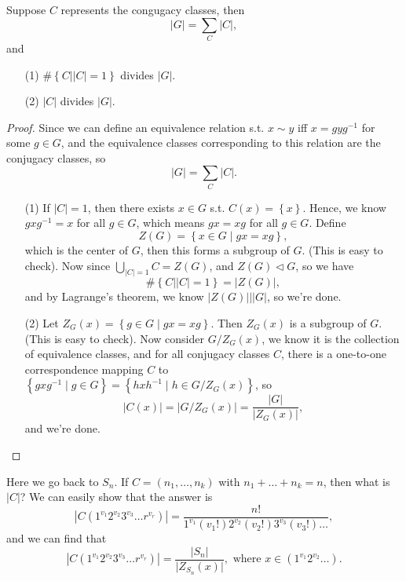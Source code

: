 \begin{theorem}
    Suppose \(C\) represents the congugacy classes, then 
    \[
        \vert G \vert = \sum_{C} \vert C \vert,   
    \] and 
    \begin{itemize}
        \item [(1)] \(\# \left\{ C \mid \vert C \vert = 1  \right\} \) divides \(\vert G \vert \). 
        \item [(2)] \(\vert C \vert \) divides \(\vert G \vert \).    
    \end{itemize}
\end{theorem}
\begin{proof}
    Since we can define an equivalence relation s.t. \(x \sim y\) iff \(x = g y g^{-1}\) for some \(g \in G\), and the equivalence classes corresponding to this relation are the conjugacy classes, so 
    \[
        \left\vert G \right\vert = \sum_{C} \vert C \vert.   
    \] 
    \begin{itemize}
        \item [(1)] If \(\vert C \vert = 1\), then there exists \(x \in G\) s.t. \(C(x) = \left\{ x \right\} \). Hence, we know \(g x g^{-1} = x\) for all \(g \in G\), which means \(gx = xg\) for all \(g \in G\). Define 
        \[
            Z(G) = \left\{ x \in G \mid gx = xg \right\}, 
        \] which is the center of \(G\), then this forms a subgroup of \(G\). (This is easy to check). Now since \(\bigcup_{\vert C \vert = 1 } C = Z(G) \), and \(Z(G) \triangleleft G \), so we have
        \[
            \# \left\{ C \mid \vert C \vert = 1  \right\} = \vert Z(G) \vert,  
        \] and by Lagrange's theorem, we know \(\vert Z(G) \vert \mid \vert G \vert  \), so we're done. 
        \item [(2)] Let \(Z_G(x) = \left\{ g \in G \mid gx = xg \right\} \). Then \(Z_G(x) \) is a subgroup of \(G\). (This is easy to check). Now consider \(G / Z_G(x)\), we know it is the collection of equivalence classes, and for all conjugacy classes \(C\), there is a one-to-one correspondence mapping \(C\) to \(\left\{ gxg^{-1} \mid g \in G \right\} = \left\{ h x h^{-1} \mid h \in G / Z_G(x) \right\} \), so 
        \[
            \vert C(x) \vert = \vert G / Z_G(x) \vert = \frac{\vert G \vert }{\vert Z_G(x) \vert },  
        \] and we're done.
    \end{itemize}
\end{proof}

Here we go back to \(S_n\). If \(C = (n_1, \dots , n_k)\) with \(n_1 + \dots + n_k = n\), then what is \(\vert C \vert \)? We can easily show that the answer is 
\[
    \left\vert C \left( 1^{v_1} 2^{v_2} 3^{v_3} \dots r^{v_r} \right)  \right\vert = \frac{n!}{1^{v_1} (v_1 !) 2^{v_2} (v_2 !) 3^{v_3} (v_3!) \dots }, 
\] and we can find that 
\[
   \left\vert C \left( 1^{v_1} 2^{v_2} 3^{v_3} \dots r^{v_r} \right) \right\vert = \frac{\vert S_n \vert }{\vert Z_{S_n}(x) \vert }, \text{ where } x \in \left( 1^{v_1} 2^{v_2} \dots  \right).  
\]